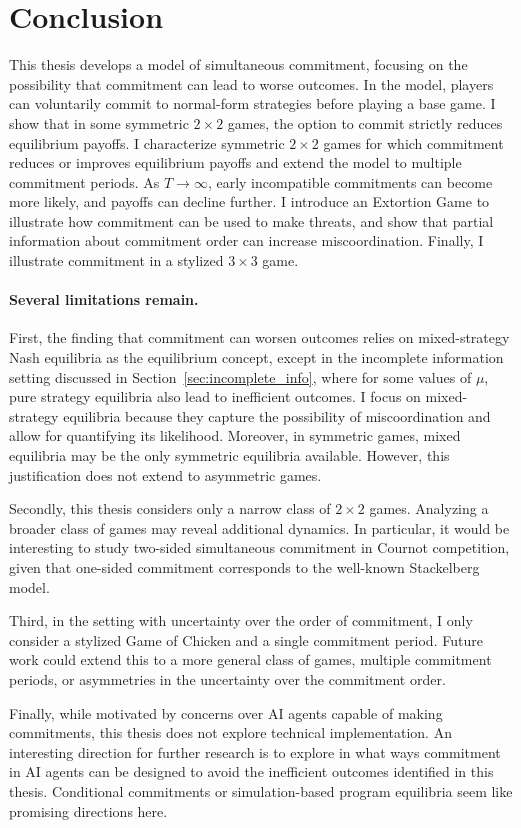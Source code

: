 \documentclass[main.tex]{subfiles}
\begin{document}
\section{Conclusion}\label{sec:conclusion}
This thesis develops a model of simultaneous commitment, focusing on the possibility that commitment can lead to worse outcomes. In the model, players can voluntarily commit to normal-form strategies before playing a base game. I show that in some symmetric $2 \times 2$ games, the option to commit strictly reduces equilibrium payoffs. I characterize symmetric $2 \times 2$ games for which commitment reduces or improves equilibrium payoffs and extend the model to multiple commitment periods. As $T \to \infty$, early incompatible commitments can become more likely, and payoffs can decline further.  I introduce an Extortion Game to illustrate how commitment can be used to make threats, and show that partial information about commitment order can increase miscoordination. Finally, I illustrate commitment in a stylized $3\times3$ game.
 
\paragraph{Several limitations remain.}
First, the finding that commitment can worsen outcomes relies on mixed-strategy Nash equilibria as the equilibrium concept, except in the incomplete information setting discussed in Section~\ref{sec:incomplete_info}, where for some values of $\mu$, pure strategy equilibria also lead to inefficient outcomes. I focus on mixed-strategy equilibria because they capture the possibility of miscoordination and allow for quantifying its likelihood. Moreover, in symmetric games, mixed equilibria may be the only symmetric equilibria available. However, this justification does not extend to asymmetric games.
 
Secondly, this thesis considers only a narrow class of $2\times2$ games. Analyzing a broader class of games may reveal additional dynamics. In particular, it would be interesting to study two-sided simultaneous commitment in Cournot competition, given that one-sided commitment corresponds to the well-known Stackelberg model.
 
Third, in the setting with uncertainty over the order of commitment, I only consider a stylized Game of Chicken and a single commitment period. Future work could extend this to a more general class of games, multiple commitment periods, or asymmetries in the uncertainty over the commitment order.
 
Finally, while motivated by concerns over AI agents capable of making commitments, this thesis does not explore technical implementation. An interesting direction for further research is to explore in what ways commitment in AI agents can be designed to avoid the inefficient outcomes identified in this thesis. Conditional commitments \parencite[]{kalai_commitment_2010} or simulation-based program equilibria \parencite[]{cooper_characterising_2024} seem like promising directions here. 
 
\newpage
\printbibliography
\newpage
\end{document}

